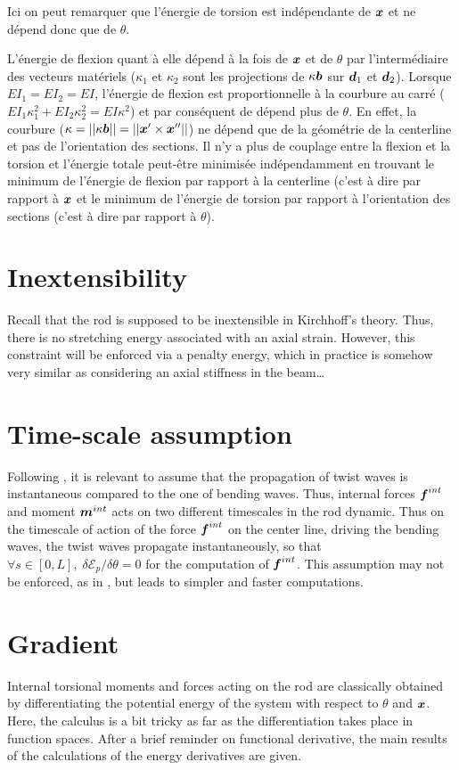 Ici on peut remarquer que l'énergie de torsion est indépendante de $\boldsymbol{x}$ et ne dépend donc que de $\theta$.

L'énergie de flexion quant à elle dépend à la fois de $\boldsymbol{x}$ et de $\theta$ par l'intermédiaire des vecteurs matériels ($\kappa_1$ et $\kappa_2$ sont les projections de $\kappa\boldsymbol{b}$ sur $\boldsymbol{d}_1$ et $\boldsymbol{d}_2$). Lorsque $EI_1 = EI_2 = EI$, l'énergie de flexion est proportionnelle à la courbure au carré ($EI_1\kappa_1^2 + EI_2\kappa_2^2 = EI\kappa^2$) et par conséquent de dépend plus de $\theta$. En effet, la courbure ($\kappa = ||\kappa\boldsymbol{b}|| = ||\boldsymbol{x}'\times\boldsymbol{x}''||$) ne dépend que de la géométrie de la centerline et pas de l'orientation des sections.
Il n'y a plus de couplage entre la flexion et la torsion et l'énergie totale peut-être minimisée indépendamment en trouvant le minimum de l'énergie de flexion par rapport à la centerline (c'est à dire par rapport à $\boldsymbol{x}$ et le minimum de l'énergie de torsion par rapport à l'orientation des sections (c'est à dire par rapport à $\theta$).

\section{Inextensibility}
Recall that the rod is supposed to be inextensible in Kirchhoff’s theory. Thus, there is no stretching energy associated with an axial strain. However, this constraint will be enforced via a penalty energy, which in practice is somehow very similar as considering an axial stiffness in the beam…

\section{Time-scale assumption}
Following \cite{Bergou2008}, it is relevant to assume that the propagation of twist waves is instantaneous compared to the one of bending waves. Thus, internal forces $\boldsymbol{f}^{int}$ and moment $\boldsymbol{m}^{int}$ acts on two different timescales in the rod dynamic. Thus on the timescale of action of the force $\boldsymbol{f}^{int}$ on the center line, driving the bending waves, the twist waves propagate instantaneously, so that $\forall s \in [0,L],\; \delta\mathcal{E}_{p}/\delta\theta=0$ for the computation of $\boldsymbol{f}^{int}$. This assumption may not be enforced, as in \cite{Nabei2014}, but leads to simpler and faster computations.

\section{Gradient}
Internal torsional moments and forces acting on the rod are classically obtained by differentiating the potential energy of the system with respect to $\theta$ and $\boldsymbol{x}$. Here, the calculus is a bit tricky as far as the differentiation takes place in function spaces. After a brief reminder on functional derivative, the main results of the calculations of the energy derivatives are given.

